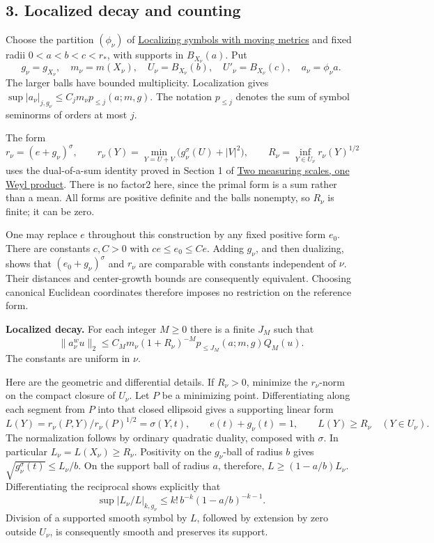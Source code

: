 \documentclass[
  11pt,
]{article}
\begin{document}
\subsection{3. Localized decay and
counting}\label{localized-decay-and-counting}

Choose the partition \((\phi_\nu)\) of
\href{metric-localization.pdf}{Localizing symbols with moving metrics}
and fixed radii \(0<a<b<c<r_*\), with supports in \(B_{X_\nu}(a)\). Put
\[
g_\nu=g_{X_\nu},\quad m_\nu=m(X_\nu),\quad
U_\nu=B_{X_\nu}(b),\quad U'_\nu=B_{X_\nu}(c),\quad
a_\nu=\phi_\nu a.
\] The larger balls have bounded multiplicity. Localization gives
\(\sup|a_\nu|_{j,g_\nu}\le C_jm_\nu p_{\le j}(a;m,g)\). The notation
\(p_{\le j}\) denotes the sum of symbol seminorms of orders at most
\(j\).

The form \[
r_\nu=(e+g_\nu)^\sigma,\qquad
r_\nu(Y)=\min_{Y=U+V}\big(g_\nu^\sigma(U)+|V|^2\big),
\qquad
R_\nu=\inf_{Y\in U_\nu}r_\nu(Y)^{1/2}
\tag{A11}
\] uses the dual-of-a-sum identity proved in Section 1 of
\href{weyl-metric-products.pdf}{Two measuring scales, one Weyl product}.
There is no factor2 here, since the primal form is a sum rather than a
mean. All forms are positive definite and the balls nonempty, so
\(R_\nu\) is finite; it can be zero.

One may replace \(e\) throughout this construction by any fixed positive
form \(e_0\). There are constants \(c,C>0\) with \(ce\le e_0\le Ce\).
Adding \(g_\nu\), and then dualizing, shows that \((e_0+g_\nu)^\sigma\)
and \(r_\nu\) are comparable with constants independent of \(\nu\).
Their distances and center-growth bounds are consequently equivalent.
Choosing canonical Euclidean coordinates therefore imposes no
restriction on the reference form.

\textbf{Localized decay.} For each integer \(M\ge0\) there is a finite
\(J_M\) such that \[
\|a_\nu^w u\|_2
\le C_Mm_\nu(1+R_\nu)^{-M}
p_{\le J_M}(a;m,g)Q_M(u).
\tag{A12}
\] The constants are uniform in \(\nu\).

Here are the geometric and differential details. If \(R_\nu>0\),
minimize the \(r_\nu\)-norm on the compact closure of \(U_\nu\). Let
\(P\) be a minimizing point. Differentiating along each segment from
\(P\) into that closed ellipsoid gives a supporting linear form \[
L(Y)=r_\nu(P,Y)/r_\nu(P)^{1/2}
=\sigma(Y,t),\qquad
e(t)+g_\nu(t)=1,\qquad
L(Y)\ge R_\nu\quad(Y\in U_\nu).
\tag{A13}
\] The normalization follows by ordinary quadratic duality, composed
with \(\sigma\). In particular \(L_\nu=L(X_\nu)\ge R_\nu\). Positivity
on the \(g_\nu\)-ball of radius \(b\) gives
\(\sqrt{g_\nu^\sigma(t)}\le L_\nu/b\). On the support ball of radius
\(a\), therefore, \(L\ge(1-a/b)L_\nu\). Differentiating the reciprocal
shows explicitly that \[
\sup|L_\nu/L|_{k,g_\nu}
\le k!\,b^{-k}(1-a/b)^{-k-1}.
\tag{A14}
\] Division of a supported smooth symbol by \(L\), followed by extension
by zero outside \(U_\nu\), is consequently smooth and preserves its
support.
\end{document}
